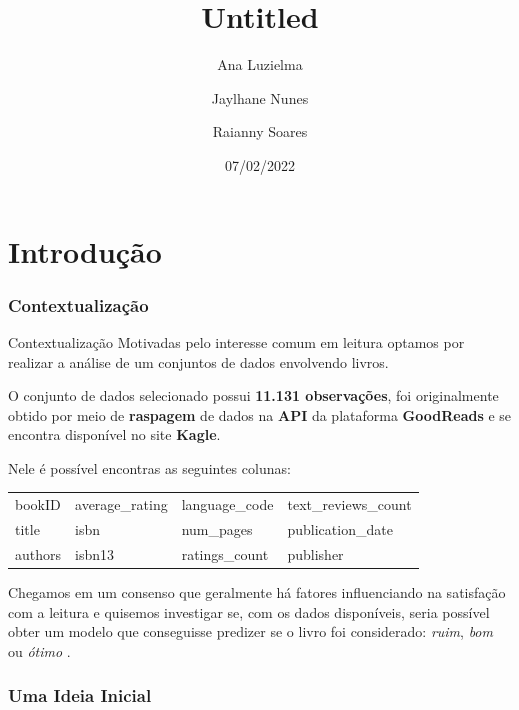 \documentclass[
  9 pt,
  ignorenonframetext,
]{beamer}
\title{Untitled}
\author{Ana Luzielma \newline \and Jaylhane Nunes \newline \and Raianny
Soares}
\date{07/02/2022}
\begin{document}
\frame{\titlepage}

\hypertarget{introduuxe7uxe3o}{%
\section{Introdução}\label{introduuxe7uxe3o}}

\hypertarget{contextualizauxe7uxe3o}{%
\subsubsection{Contextualização}\label{contextualizauxe7uxe3o}}

\begin{frame}{Contextualização}
Motivadas pelo interesse comum em leitura optamos por realizar a análise
de um conjuntos de dados envolvendo livros.

O conjunto de dados selecionado possui \textbf{11.131 observações}, foi
originalmente obtido por meio de \textbf{raspagem} de dados na
\textbf{API} da plataforma \textbf{GoodReads} e se encontra disponível
no site \textbf{Kagle}.

Nele é possível encontras as seguintes colunas:

\begin{table}[H]
\centering
\begin{tabular}{llll}
\toprule
bookID & average\_rating & language\_code & text\_reviews\_count\\
title & isbn & num\_pages & publication\_date\\
authors & isbn13 & ratings\_count & publisher\\
\bottomrule
\end{tabular}
\end{table}

Chegamos em um consenso que geralmente há fatores influenciando na
satisfação com a leitura e quisemos investigar se, com os dados
disponíveis, seria possível obter um modelo que conseguisse predizer se
o livro foi considerado: \emph{ruim}, \emph{bom} ou \emph{ótimo} .
\end{frame}

\hypertarget{uma-ideia-inicial}{%
\subsubsection{Uma Ideia Inicial}\label{uma-ideia-inicial}}
\end{document}
